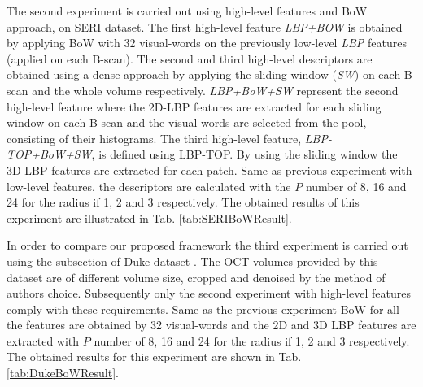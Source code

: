 The second experiment is carried out using high-level features and BoW approach, on SERI dataset. The first high-level feature \textit{LBP+BOW} is obtained by applying BoW with 32 visual-words on the previously low-level \textit{LBP} features (applied on each B-scan). The second and third high-level descriptors are obtained using a dense approach by applying the sliding window (\textit{SW}) on each B-scan and the whole volume respectively. \textit{LBP+BoW+SW} represent the second high-level feature where the 2D-LBP features are extracted for each sliding window on each B-scan and the visual-words are selected from the pool, consisting of their histograms. The third high-level feature, \textit{LBP-TOP+BoW+SW}, is defined using LBP-TOP. By using the sliding window the 3D-LBP features are extracted for each patch. Same as previous experiment with low-level features, the descriptors are calculated with the $P$ number of 8, 16 and 24 for the radius if 1, 2 and 3 respectively. The obtained results of this experiment are illustrated in Tab. \ref{tab:SERIBoWResult}. 

In order to compare our proposed framework the third experiment is carried out using the subsection of Duke dataset \citep{Srinivasan2014}. The OCT volumes provided by this dataset are of different volume size, cropped and denoised by the method of authors choice. Subsequently only the second experiment with high-level features comply with these requirements. Same as the previous experiment BoW for all the features are obtained by 32 visual-words and the 2D and 3D LBP features are extracted with $P$ number of 8, 16 and 24 for the radius if 1, 2 and 3 respectively. The obtained results for this experiment are shown in Tab. \ref{tab:DukeBoWResult}.

